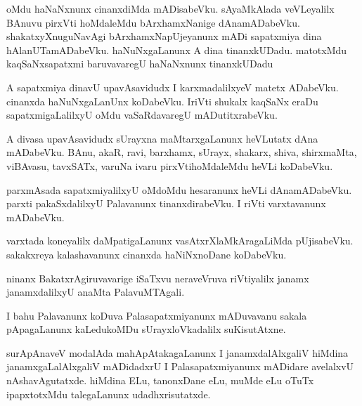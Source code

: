 \documentclass{article}
\begin{document}
\begin{mn}
oMdu  haNaNxnunx  cinanxdiMda  mADisabeVku.  sAyaMkAlada  veVLeyalilx  BAnuvu  pirxVti 
hoMdaleMdu  bArxhamxNanige  dAnamADabeVku.  shakatxyXnuguNavAgi  bArxhamxNapUjeyanunx  
mADi  sapatxmiya  dina  hAlanUTamADabeVku.  haNuNxgaLanunx  A  dina  tinanxkUDadu.  
matotxMdu  kaqSaNxsapatxmi  baruvavaregU  haNaNxnunx  tinanxkUDadu  
\end{mn}

\begin{mn}
A  sapatxmiya  dinavU  upavAsavidudx  I  karxmadalilxyeV  matetx  ADabeVku.  cinanxda  
haNuNxgaLanUnx  koDabeVku.  IriVti  shukalx  kaqSaNx  eraDu  sapatxmigaLalilxyU  oMdu  
vaSaRdavaregU  mADutitxrabeVku.
\end{mn}

\begin{mn}
A  divasa  upavAsavidudx  sUrayxna  maMtarxgaLanunx  heVLutatx  dAna  mADabeVku.  
BAnu,  akaR,  ravi,  barxhamx,  sUrayx,  shakarx,  shiva,  shirxmaMta,  viBAvasu,  
tavxSATx,  varuNa  ivaru  pirxVtihoMdaleMdu  heVLi  koDabeVku.
\end{mn}

\begin{mn}
parxmAsada  sapatxmiyalilxyU  oMdoMdu  hesaranunx  heVLi dAnamADabeVku.  parxti  
pakaSxdalilxyU  Palavanunx  tinanxdirabeVku.  I riVti  varxtavanunx  mADabeVku.
\end{mn}

\begin{mn}
varxtada  koneyalilx  daMpatigaLanunx  vasAtxrXlaMkAragaLiMda  pUjisabeVku.  
sakakxreya  kalashavanunx  cinanxda  haNiNxnoDane  koDabeVku.
\end{mn}

\begin{mn}
ninanx  BakatxrAgiruvavarige  iSaTxvu  neraveVruva  riVtiyalilx  janamx 
janamxdalilxyU  anaMta  PalavuMTAgali.
\end{mn}

\begin{mn}
I bahu  Palavanunx  koDuva  Palasapatxmiyanunx  mADuvavanu  sakala  pApagaLanunx  
kaLedukoMDu  sUrayxloVkadalilx  suKisutAtxne.
\end{mn}

\begin{mn}
surApAnaveV  modalAda  mahApAtakagaLanunx  I  janamxdalAlxgaliV  hiMdina  janamxgaLalAlxgaliV  
mADidadxrU  I  Palasapatxmiyanunx  mADidare  avelalxvU  nAshavAgutatxde.  hiMdina  ELu,  
tanonxDane  eLu,  muMde  eLu  oTuTx  ipapxtotxMdu  talegaLanunx  udadhxrisutatxde.
\end{mn}
\end{document}

